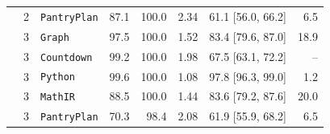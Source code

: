 \begin{longtable}{@{}lrlrrrrr@{}}
     & 2 & \texttt{PantryPlan} & 87.1 & 100.0 & 2.34 & 61.1 [56.0, 66.2] & 6.5 \\
     & 3 & \texttt{Graph} & 97.5 & 100.0 & 1.52 & 83.4 [79.6, 87.0] & 18.9 \\
     & 3 & \texttt{Countdown} & 99.2 & 100.0 & 1.98 & 67.5 [63.1, 72.2] & -- \\
     & 3 & \texttt{Python} & 99.6 & 100.0 & 1.08 & 97.8 [96.3, 99.0] & 1.2 \\
     & 3 & \texttt{MathIR} & 88.5 & 100.0 & 1.44 & 83.6 [79.2, 87.6] & 20.0 \\
     & 3 & \texttt{PantryPlan} & 70.3 & 98.4 & 2.08 & 61.9 [55.9, 68.2] & 6.5 \\
\end{longtable}
\endgroup
